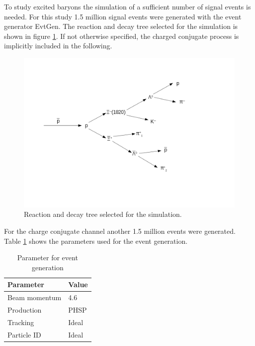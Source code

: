 To study excited \cascade baryons the simulation of a sufficient number of signal events is needed.
For this study 1.5 million signal events were generated with the event generator EvtGen.
The reaction and decay tree selected for the simulation is shown in figure \ref{fig:eventgeneration_decaychannel}.
If not otherwise specified, the charged conjugate process is implicitly included in the following. 

\begin{figure}[htbp]
	\centering
			\includegraphics[width=1.00\textwidth]{./plots/DecayChannelXi1820.png}
	\caption{Reaction and decay tree selected for the simulation.}
	\label{fig:eventgeneration_decaychannel}
\end{figure}

For the charge conjugate channel another 1.5 million events were generated.
Table \ref{tab:eventgeneration_parameter} shows the parameters used for the event generation.

\begin{table}[tbp]
	\caption{Parameter for event generation}
	\label{tab:eventgeneration_parameter}
	\centering
	\begin{tabular}{ll}
		\hline
		Parameter & Value \\
		\hline
		\hline
		Beam momentum & 4.6 \massunit \\
		Production & PHSP \\
		Tracking & Ideal \\
		Particle ID & Ideal \\\hline
		 
	\end{tabular}
\end{table}

